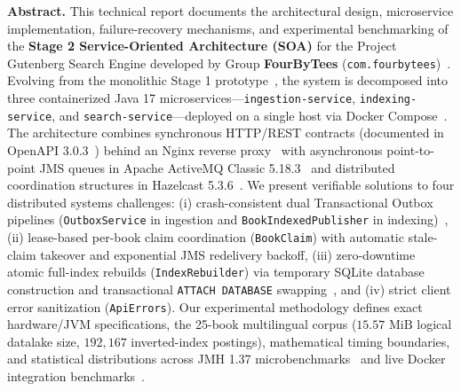 \documentclass[10pt,a4paper]{article}
\begin{document}
\begin{titlepage}
    \vfill
    \begin{minipage}{0.96\textwidth}
        \footnotesize
        \textbf{Abstract.} This technical report documents the architectural design, microservice implementation, failure-recovery mechanisms, and experimental benchmarking of the \textbf{Stage 2 Service-Oriented Architecture (SOA)} for the Project Gutenberg Search Engine developed by Group \textbf{FourByTees} (\texttt{com.fourbytees})~\cite{ulpgc_stage2_spec}. Evolving from the monolithic Stage 1 prototype~\cite{ulpgc_stage1_spec}, the system is decomposed into three containerized Java 17 microservices---\texttt{ingestion-service}, \texttt{indexing-service}, and \texttt{search-service}---deployed on a single host via Docker Compose~\cite{docker_docs}. The architecture combines synchronous HTTP/REST contracts (documented in OpenAPI 3.0.3~\cite{openapi_spec}) behind an Nginx reverse proxy~\cite{nginx_docs} with asynchronous point-to-point JMS queues in Apache ActiveMQ Classic 5.18.3~\cite{activemq_docs} and distributed coordination structures in Hazelcast 5.3.6~\cite{hazelcast_docs}. We present verifiable solutions to four distributed systems challenges: (i) crash-consistent dual Transactional Outbox pipelines (\texttt{OutboxService} in ingestion and \texttt{BookIndexedPublisher} in indexing)~\cite{microservices_richardson}, (ii) lease-based per-book claim coordination (\texttt{BookClaim}) with automatic stale-claim takeover and exponential JMS redelivery backoff, (iii) zero-downtime atomic full-index rebuilds (\texttt{IndexRebuilder}) via temporary SQLite database construction and transactional \texttt{ATTACH DATABASE} swapping~\cite{sqlite_wal_docs}, and (iv) strict client error sanitization (\texttt{ApiErrors}). Our experimental methodology defines exact hardware/JVM specifications, the 25-book multilingual corpus ($15.57\text{ MiB}$ logical datalake size, $192,167$ inverted-index postings), mathematical timing boundaries, and statistical distributions across JMH 1.37 microbenchmarks~\cite{jmh_docs} and live Docker integration benchmarks~\cite{fourbytees_benchmarks}.
    \end{minipage}
    \vspace{0.2cm}
\end{titlepage}

\tableofcontents
\newpage
\end{document}
